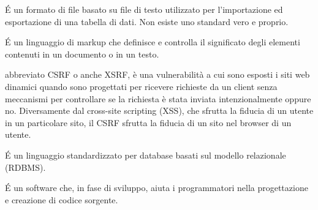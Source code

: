 \begin{acronym}
{\small \'E un formato di file basato su file di testo utilizzato per l'importazione ed esportazione di una tabella di dati. Non esiste uno standard vero e proprio. \par}
%

{\small \'E un linguaggio di markup che definisce e controlla il significato degli elementi contenuti in un documento o in un testo. \par}
%

{\small abbreviato CSRF o anche XSRF, è una vulnerabilità a cui sono esposti i siti web dinamici quando sono progettati per ricevere richieste da un client senza meccanismi per controllare se la richiesta è stata inviata intenzionalmente oppure no. Diversamente dal cross-site scripting (XSS), che sfrutta la fiducia di un utente in un particolare sito, il CSRF sfrutta la fiducia di un sito nel browser di un utente. \par}
%

{\small \'E un linguaggio standardizzato per database basati sul modello relazionale (RDBMS).  \par}
%

{\small \'E un software che, in fase di sviluppo, aiuta i programmatori nella progettazione e creazione di codice sorgente.  \par}
%
\end{acronym}